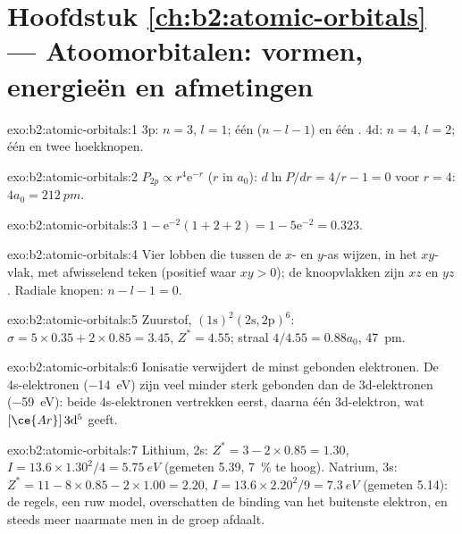 \section*{Hoofdstuk \ref{ch:b2:atomic-orbitals} --- Atoomorbitalen: vormen, energieën en afmetingen}

\begin{solution}{exo:b2:atomic-orbitals:1}
3p: $n = 3$, $l = 1$; één  ($n - l - 1$) en één . 4d: $n = 4$,
$l = 2$; één  en twee hoekknopen.
\end{solution}

\begin{solution}{exo:b2:atomic-orbitals:2}
$P_{2p} \propto r^4\mathrm e^{-r}$ ($r$ in $a_0$): $d\ln P/dr = 4/r - 1 = 0$ voor $r = 4$:
$4a_0 = \qty{212}{pm}$.
\end{solution}

\begin{solution}{exo:b2:atomic-orbitals:3}
$1 - \mathrm e^{-2}(1 + 2 + 2) = 1 - 5\mathrm e^{-2} = 0.323$.
\end{solution}

\begin{solution}{exo:b2:atomic-orbitals:4}
Vier lobben die tussen de $x$- en $y$-as wijzen, in het $xy$-vlak, met afwisselend
teken (positief waar $xy > 0$); de knoopvlakken zijn $xz$ en $yz$. Radiale knopen:
$n - l - 1 = 0$.
\end{solution}

\begin{solution}{exo:b2:atomic-orbitals:5}
Zuurstof, $(1\mathrm s)^2(2\mathrm s, 2\mathrm p)^6$: $\sigma = 5 \times 0.35 + 2 \times 0.85
= 3.45$, $Z^* = 4.55$; straal $4/4.55 = 0.88a_0$, \qty{47}{pm}.
\end{solution}

\begin{solution}{exo:b2:atomic-orbitals:6}
Ionisatie verwijdert de minst gebonden elektronen. De 4s-elektronen
(\qty{-14}{eV}) zijn veel minder sterk gebonden dan de 3d-elektronen (\qty{-59}{eV}): beide 4s-elektronen
vertrekken eerst, daarna één 3d-elektron, wat $[\ce{Ar}]\,3\mathrm d^5$ geeft.
\end{solution}

\begin{solution}{exo:b2:atomic-orbitals:7}
Lithium, 2s: $Z^* = 3 - 2 \times 0.85 = 1.30$, $I = 13.6 \times 1.30^2/4 =
\qty{5.75}{eV}$ (gemeten 5.39, 7~\% te hoog). Natrium, 3s: $Z^* = 11 - 8 \times 0.85 -
2 \times 1.00 = 2.20$, $I = 13.6 \times 2.20^2/9 = \qty{7.3}{eV}$ (gemeten 5.14): de
regels, een ruw model, overschatten de binding van het buitenste elektron, en steeds meer
naarmate men in de groep afdaalt.
\end{solution}

